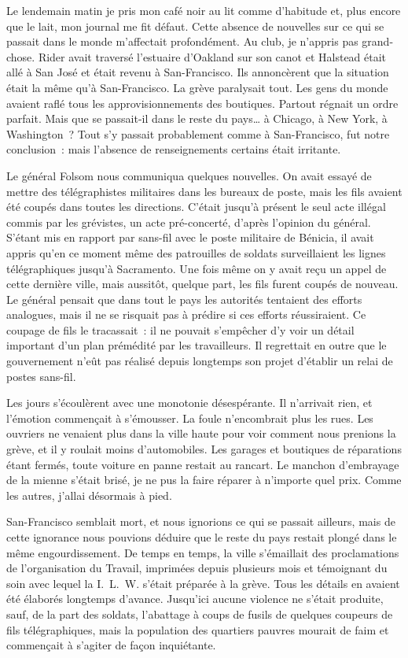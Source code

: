 \documentclass[french,twoside]{book} %
\begin{document}
\noindent Le lendemain matin je pris mon café noir au lit comme d’habitude et, plus encore que le lait, mon journal me fit défaut. Cette absence de nouvelles sur ce qui se passait dans le monde m’affectait profondément. Au club, je n’appris pas grand-chose. Rider avait traversé l’estuaire d’Oakland sur son canot et Halstead était allé à San José et était revenu à San-Francisco. Ils annoncèrent que la situation était la même qu’à San-Francisco. La grève paralysait tout. Les gens du monde avaient raflé tous les approvisionnements des boutiques. Partout régnait un ordre parfait. Mais que se passait-il dans le reste du pays… à Chicago, à New York, à Washington ? Tout s’y passait probablement comme à San-Francisco, fut notre conclusion : mais l’absence de renseignements certains était irritante.\par
Le général Folsom nous communiqua quelques nouvelles. On avait essayé de mettre des télégraphistes militaires dans les bureaux de poste, mais les fils avaient été coupés dans toutes les directions. C’était jusqu’à présent le seul acte illégal commis par les grévistes, un acte pré-concerté, d’après l’opinion du général. S’étant mis en rapport par sans-fil avec le poste militaire de Bénicia, il avait appris qu’en ce moment même des patrouilles de soldats surveillaient les lignes télégraphiques jusqu’à Sacramento. Une fois même on y avait reçu un appel de cette dernière ville, mais aussitôt, quelque part, les fils furent coupés de nouveau. Le général pensait que dans tout le pays les autorités tentaient des efforts analogues, mais il ne se risquait pas à prédire si ces efforts réussiraient. Ce coupage de fils le tracassait : il ne pouvait s’empêcher d’y voir un détail important d’un plan prémédité par les travailleurs. Il regrettait en outre que le gouvernement n’eût pas réalisé depuis longtemps son projet d’établir un relai de postes sans-fil.\par
Les jours s’écoulèrent avec une monotonie désespérante. Il n’arrivait rien, et l’émotion commençait à s’émousser. La foule n’encombrait plus les rues. Les ouvriers ne venaient plus dans la ville haute pour voir comment nous prenions la grève, et il y roulait moins d’automobiles. Les garages et boutiques de réparations étant fermés, toute voiture en panne restait au rancart. Le manchon d’embrayage de la mienne s’était brisé, je ne pus la faire réparer à n’importe quel prix. Comme les autres, j’allai désormais à pied.\par
San-Francisco semblait mort, et nous ignorions ce qui se passait ailleurs, mais de cette ignorance nous pouvions déduire que le reste du pays restait plongé dans le même engourdissement. De temps en temps, la ville s’émaillait des proclamations de l’organisation du Travail, imprimées depuis plusieurs mois et témoignant du soin avec lequel la I. L. W. s’était préparée à la grève. Tous les détails en avaient été élaborés longtemps d’avance. Jusqu’ici aucune violence ne s’était produite, sauf, de la part des soldats, l’abattage à coups de fusils de quelques coupeurs de fils télégraphiques, mais la population des quartiers pauvres mourait de faim et commençait à s’agiter de façon inquiétante.\par
\end{document}
